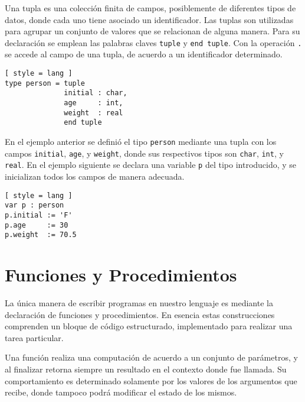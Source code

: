 Una tupla es una colección finita de campos, posiblemente de diferentes tipos de datos, donde cada uno tiene asociado un identificador.
Las tuplas son utilizadas para agrupar un conjunto de valores que se relacionan de alguna manera.
Para su declaración se emplean las palabras claves \lstinline[style = lang]{tuple} y \lstinline[style = lang]{end tuple}.
Con la operación \lstinline[style = lang]{.} se accede al campo de una tupla, de acuerdo a un identificador determinado.

\begin{lstlisting}[ style = lang ]
type person = tuple
              initial : char,
              age     : int,
              weight  : real
              end tuple
\end{lstlisting}

En el ejemplo anterior se definió el tipo \lstinline[style = lang]{person} mediante una tupla con los campos \lstinline[style = lang]{initial}, \lstinline[style = lang]{age}, y \lstinline[style = lang]{weight}, donde sus respectivos tipos son \lstinline[style = lang]{char}, \lstinline[style = lang]{int}, y \lstinline[style = lang]{real}.
En el ejemplo siguiente se declara una variable \lstinline[style = lang]{p} del tipo introducido, y se inicializan todos los campos de manera adecuada.

\begin{lstlisting}[ style = lang ]
var p : person
p.initial := 'F'
p.age     := 30
p.weight  := 70.5
\end{lstlisting}



\section{Funciones y Procedimientos}

La única manera de escribir programas en nuestro lenguaje es mediante la declaración de funciones y procedimientos.
En esencia estas construcciones comprenden un bloque de código estructurado, implementado para realizar una tarea particular.

Una función realiza una computación de acuerdo a un conjunto de parámetros, y al finalizar retorna siempre un resultado en el contexto donde fue llamada.
Su comportamiento es determinado solamente por los valores de los argumentos que recibe, donde tampoco podrá modificar el estado de los mismos.

